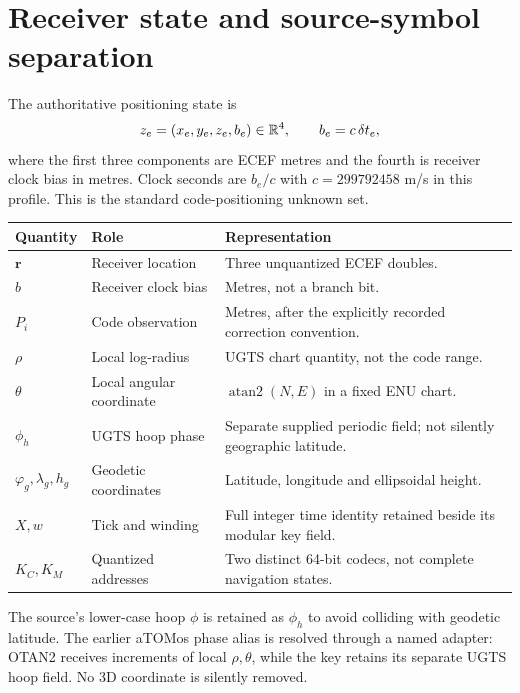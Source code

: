 \section{Receiver state and source-symbol separation}
The authoritative positioning state is
\begin{equation}
z_e=(x_e,y_e,z_e,b_e)\in\mathbb R^4,\qquad b_e=c\,\delta t_e,
\end{equation}
where the first three components are ECEF metres and the fourth is receiver clock
bias in metres. Clock seconds are $b_e/c$ with $c=299792458$ m/s in this profile.
This is the standard code-positioning unknown set. 

\par\small
\begin{tabularx}{\textwidth}{@{}P{.22\textwidth}P{.30\textwidth}Y@{}}\toprule
\textbf{Quantity} & \textbf{Role} & \textbf{Representation}\\\midrule
$\boldsymbol r$ & Receiver location & Three unquantized ECEF doubles.\\
$b$ & Receiver clock bias & Metres, not a branch bit.\\
$P_i$ & Code observation & Metres, after the explicitly recorded correction convention.\\
$\rho$ & Local log-radius & UGTS chart quantity, not the code range.\\
$\theta$ & Local angular coordinate & $\operatorname{atan2}(N,E)$ in a fixed ENU chart.\\
$\phi_h$ & UGTS hoop phase & Separate supplied periodic field; not silently geographic latitude.\\
$\varphi_g,\lambda_g,h_g$ & Geodetic coordinates & Latitude, longitude and ellipsoidal height.\\
$X,w$ & Tick and winding & Full integer time identity retained beside its modular key field.\\
$K_C,K_M$ & Quantized addresses & Two distinct 64-bit codecs, not complete navigation states.\\\bottomrule
\end{tabularx}
\par\normalsize

The source's lower-case hoop $\phi$ is retained as $\phi_h$ to avoid colliding with
geodetic latitude. The earlier aTOMos phase alias is resolved through a named adapter:
OTAN2 receives increments of local $\rho,\theta$, while the key retains its separate
UGTS hoop field. No 3D coordinate is silently removed. 


